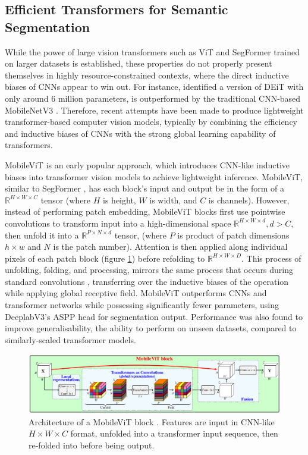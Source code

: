 \documentclass[a4paper,12pt]{report}
\begin{document}
\subsection{Efficient Transformers for Semantic Segmentation}

While the power of large vision transformers such as ViT and SegFormer trained on larger datasets is established, these properties do not properly present themselves in highly resource-constrained contexts, where the direct inductive biases of CNNs appear to win out. For instance, \cite{mehta_mobilevit_2022} identified a version of DEiT \cite{touvron_training_2021} with only around 6 million parameters, is outperformed by the traditional CNN-based MobileNetV3 \cite{howard_searching_2019}. Therefore, recent attempts have been made to produce lightweight transformer-based computer vision models, typically by combining the efficiency and inductive biases of CNNs with the strong global learning capability of transformers.

MobileViT \cite{mehta_mobilevit_2022} is an early popular approach, which introduces CNN-like inductive biases into transformer vision models to achieve lightweight inference. MobileViT, similar to SegFormer \cite{xie_segformer_2021}, has each block's input and output be in the form of a $\mathbb{R}^{H \times W \times C}$ tensor (where $H$ is height, $W$ is width, and $C$ is channels). However, instead of performing patch embedding, MobileViT blocks first use pointwise convolutions to transform input into a high-dimensional space $\mathbb{R}^{H \times W \times d}, d > C$, then unfold it into a $\mathbb{R}^{P \times N \times d}$ tensor, (where $P$ is product of patch dimensions $h \times w$ and $N$ is the patch number). Attention is then applied along individual pixels of each patch block (figure \ref{fig:mobilevit_block}) before refolding to $\mathbb{R}^{H \times W \times D}$. This process of unfolding, folding, and processing, mirrors the same process that occurs during standard convolutions \cite{pytorch_contributors_unfold_nodate}, transferring over the inductive biases of the operation while applying global receptive field. MobileViT outperforms CNNs and transformer networks while possessing significantly fewer parameters, using DeeplabV3's ASPP head \cite{chen_rethinking_2017} for segmentation output. Performance was also found to improve generalisability, the ability to perform on unseen datasets, compared to similarly-scaled transformer models.

\begin{figure}[t!]
    \centering
    \includegraphics[width=\textwidth]{res/mobilevit-block.png}
    \caption{Architecture of a MobileViT block \cite{mehta_mobilevit_2022}. Features are input in CNN-like $H \times W \times C$ format, unfolded into a transformer input sequence, then re-folded into before being output.}
    \label{fig:mobilevit_block}
\end{figure}
\end{document}

